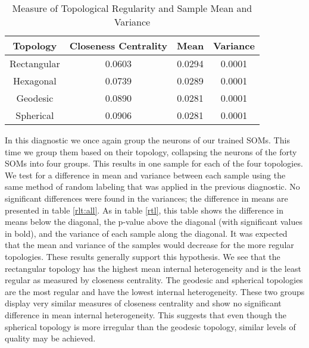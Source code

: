\begin{table}
\centering
\begin{minipage}{\textwidth}
\caption{Measure of Topological Regularity and Sample Mean and Variance}
\label{vardeg}
\begin{tabular}{|c||c|c|c|}
\hline
Topology & Closeness Centrality & Mean & Variance\\
\hline
Rectangular & 0.0603 & 0.0294 &0.0001\\
Hexagonal & 0.0739 & 0.0289 &0.0001\\
Geodesic & 0.0890 & 0.0281 &0.0001\\
Spherical & 0.0906 & 0.0281 &0.0001\\
\hline
\end{tabular}
\end{minipage}
\end{table}

In this diagnostic we once again group the neurons of our trained SOMs. This
time we group them based on their topology, collapsing the neurons of the
forty SOMs into four groups.  This results in one sample for each of the four
topologies.  We test for a
difference in mean and variance between each sample using the same method of
random labeling that was applied in the previous diagnostic.  No significant
differences were found in the variances; the difference in means are presented
in table \ref{rlt:all}.  As in table \ref{rtl}, this table shows the
difference in means below the diagonal, the p-value above the diagonal (with
significant values in bold), and the variance of each sample along the
diagonal.  It was expected that the mean and variance of the
samples would decrease for the more regular topologies.  These results
generally support this hypothesis. We see that the rectangular topology has
the highest mean internal heterogeneity and is the least regular as measured by
closeness centrality. The geodesic and spherical topologies are the most
regular and have the lowest internal heterogeneity. These two groups display very
similar measures of closeness centrality and show no significant difference in
mean internal heterogeneity.  This suggests that even though the spherical topology
is more irregular than the geodesic topology, similar levels of quality may be
achieved.


